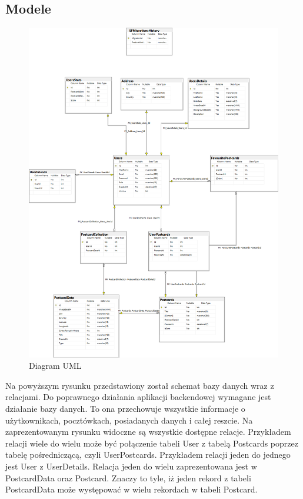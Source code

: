 \documentclass[a4paper,twoside,12pt]{book}
\begin{document}
\subsection{Modele}
\begin{figure}[H]
    \centering
    \includegraphics[width=1\textwidth]{diagram1.png}
    \caption{Diagram UML}
    \label{Kompilator}
\end{figure}
Na powyższym rysunku przedstawiony został schemat bazy danych wraz z relacjami. Do poprawnego działania aplikacji backendowej wymagane jest działanie bazy danych. To ona przechowuje wszystkie informacje o użytkownikach, pocztówkach, posiadanych danych i całej reszcie. Na zaprezentowanym rysunku widoczne są wszystkie dostępne relacje. Przykładem relacji wiele do wielu może być połączenie tabeli User z tabelą Postcards poprzez tabelę pośredniczącą, czyli UserPostcards. Przykładem relacji jeden do jednego jest User z UserDetails. Relacja jeden do wielu zaprezentowana jest w PostcardData oraz Postcard. Znaczy to tyle, iż jeden rekord z tabeli PostcardData może występować w wielu rekordach w tabeli Postcard.
\end{document}
